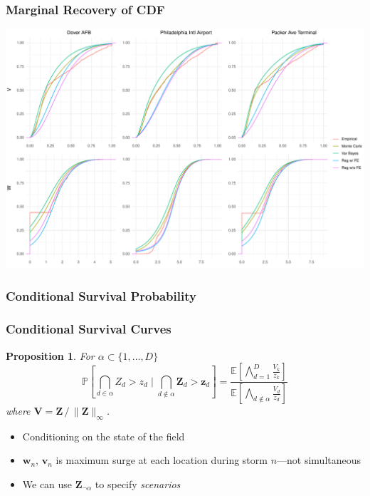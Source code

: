 \documentclass[aspectratio=169,10pt]{beamer}
\newtheorem{prop}{Proposition}
\newlength{\frametextheight}
\begin{document}
\begin{frame}
    \frametitle{Marginal Recovery of CDF}
    \begin{center}
        \includegraphics[height=0.99\frametextheight]{./ch3/plots/delaware_marginal_cdfs}
    \end{center}
\end{frame} %

\subsubsection{Conditional Survival Probability}

\begin{frame}
    \frametitle{Conditional Survival Curves}
    \begin{prop}
      For $\alpha \subset \lbrace 1, \ldots, D\rbrace$
    \[
        \mathbb{P}\left[\bigcap_{d\in\alpha}Z_{d} > z_d\mid \bigcap_{d\not\in\alpha}\bm{Z}_{d} > \bm{z}_{d}\right] =
        \frac{\mathbb{E}\left[\bigwedge_{d = 1}^D \frac{V_k}{z_k}\right]}{
                      \mathbb{E}\left[\bigwedge_{d\not\in\alpha}\frac{V_d}{z_d}\right]}
    \]
      where $\bm{V} = \bm{Z}\,/\,\lVert\bm{Z}\rVert_{\infty}$.
  \end{prop}
    \begin{itemize}
        \item Conditioning on the state of the field
        \item $\bm{w}_n$, $\bm{v}_n$ is maximum surge at each location during storm $n$---not simultaneous
        \item We can use $\bm{Z}_{\neg\alpha}$ to specify \emph{scenarios}
    \end{itemize}
\end{frame} %
\end{document}
